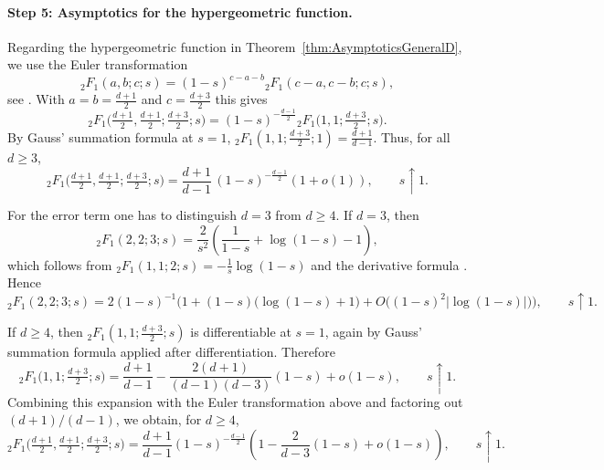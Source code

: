 \documentclass[11pt,a4paper]{article}
\theoremstyle{plain}
\theoremstyle{definition}
\theoremstyle{remark}
\begin{document}
\paragraph{Step 5: Asymptotics for the hypergeometric function.}

Regarding the hypergeometric function in Theorem~\ref{thm:AsymptoticsGeneralD}, we use the Euler transformation
\[
	{}_2F_1(a,b;c;s)
	=
	(1-s)^{c-a-b}
		{}_2F_1(c-a,c-b;c;s),
\]
see \cite[Equation~15.8.1]{NIST}. With $a=b=\frac{d+1}{2}$ and $c=\frac{d+3}{2}$ this gives
\[
	{}_2F_1\!\Big(\tfrac{d+1}{2},\tfrac{d+1}{2};
	\tfrac{d+3}{2};s\Big)
	=
	(1-s)^{-\frac{d-1}{2}}
		{}_2F_1\!\Big(1,1;\tfrac{d+3}{2};s\Big).
\]
By Gauss' summation formula \cite[Equation~15.4.20]{NIST} at $s=1$, ${}_2F_1(1,1;\tfrac{d+3}{2};1)=\frac{d+1}{d-1}$.
Thus, for all $d\ge3$,
\[
	{}_2F_1\!\Big(\tfrac{d+1}{2},\tfrac{d+1}{2};
	\tfrac{d+3}{2};s\Big)
	=
	\frac{d+1}{d-1}\,
	(1-s)^{-\frac{d-1}{2}}(1+o(1)),
	\qquad s\uparrow1.
\]

For the error term one has to distinguish $d=3$ from $d\ge4$. If
$d=3$, then
\[
	{}_2F_1(2,2;3;s)
	=
	\frac{2}{s^2}
	\left(
	\frac{1}{1-s}+\log(1-s)-1
	\right),
\]
which follows from
${}_2F_1(1,1;2;s)=-\frac{1}{s}\log(1-s)$ and the derivative formula
\cite[Equations~15.4.1 and~15.5.1]{NIST}. Hence
\begin{equation}\label{eq:HypergeomAsympt1}
	{}_2F_1(2,2;3;s)
	=
	2(1-s)^{-1}
	\Big(
	1
	+
	(1-s)\big(\log(1-s)+1\big)
	+
	O\big((1-s)^2|\log(1-s)|\big)
	\Big),
	\qquad s\uparrow1.
\end{equation}

If $d\ge4$, then
${}_2F_1(1,1;\tfrac{d+3}{2};s)$ is differentiable at $s=1$, again by
Gauss' summation formula applied after differentiation. Therefore
\[
	{}_2F_1\!\Big(1,1;\tfrac{d+3}{2};s\Big)
	=
	\frac{d+1}{d-1}
	-
	\frac{2(d+1)}{(d-1)(d-3)}(1-s)
	+o(1-s),
	\qquad s\uparrow1.
\]
Combining this expansion with the Euler transformation above and factoring
out \((d+1)/(d-1)\), we obtain, for \(d\ge4\),
\begin{equation}\label{eq:HypergeomAsympt2}
	{}_2F_1\!\Big(\tfrac{d+1}{2},\tfrac{d+1}{2};
	\tfrac{d+3}{2};s\Big)
	=
	\frac{d+1}{d-1}
	(1-s)^{-\frac{d-1}{2}}
	\left(
	1-\frac{2}{d-3}(1-s)+o(1-s)
	\right),
	\qquad s\uparrow1.
\end{equation}
\end{document}
